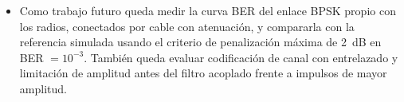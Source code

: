 \begin{itemize}
    \item Como trabajo futuro queda medir la curva BER del enlace BPSK propio con los radios, conectados por cable con atenuación, y compararla con la referencia simulada usando el criterio de penalización máxima de 2~dB en BER $=10^{-3}$. También queda evaluar codificación de canal con entrelazado y limitación de amplitud antes del filtro acoplado frente a impulsos de mayor amplitud.
\end{itemize}
